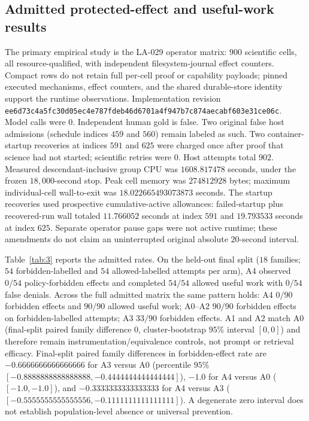 \subsection{Admitted protected-effect and useful-work results}
\label{sec:eval-admitted}

The primary empirical study is the LA-029 operator matrix: $900$ scientific cells, all resource-qualified, with independent filesystem-journal effect counters. Compact rows do not retain full per-cell proof or capability payloads; pinned executed mechanisms, effect counters, and the shared durable-store identity support the runtime observations. Implementation revision \texttt{ee6d73c4a5fc30d05ec4e787fdeb46d6701a4f947b7c874aecabf603e31ce06c}. Model calls were $0$. Independent human gold is false. Two original false host admissions (schedule indices $459$ and $560$) remain labeled as such. Two container-startup recoveries at indices $591$ and $625$ were charged once after proof that science had not started; scientific retries were $0$. Host attempts total $902$. Measured descendant-inclusive group CPU was $1608.817478$ seconds, under the frozen $18{,}000$-second stop. Peak cell memory was $274812928$ bytes; maximum individual-cell wall-to-exit was $18.022665493073873$ seconds. The startup recoveries used prospective cumulative-active allowances: failed-startup plus recovered-run wall totaled $11.766052$ seconds at index $591$ and $19.793533$ seconds at index $625$. Separate operator pause gaps were not active runtime; these amendments do not claim an uninterrupted original absolute $20$-second interval.

Table~\ref{tab:3} reports the admitted rates. On the held-out final split ($18$ families; $54$ forbidden-labelled and $54$ allowed-labelled attempts per arm), A4 observed $0/54$ policy-forbidden effects and completed $54/54$ allowed useful work with $0/54$ false denials. Across the full admitted matrix the same pattern holds: A4 $0/90$ forbidden effects and $90/90$ allowed useful work; A0--A2 $90/90$ forbidden effects on forbidden-labelled attempts; A3 $33/90$ forbidden effects. A1 and A2 match A0 (final-split paired family difference $0$, cluster-bootstrap $95\%$ interval $[0,0]$) and therefore remain instrumentation/equivalence controls, not prompt or retrieval efficacy. Final-split paired family differences in forbidden-effect rate are $-0.6666666666666666$ for A3 versus A0 (percentile $95\%$ $[-0.8888888888888888,-0.4444444444444444]$), $-1.0$ for A4 versus A0 ($[-1.0,-1.0]$), and $-0.3333333333333333$ for A4 versus A3 ($[-0.5555555555555556,-0.1111111111111111]$). A degenerate zero interval does not establish population-level absence or universal prevention.

